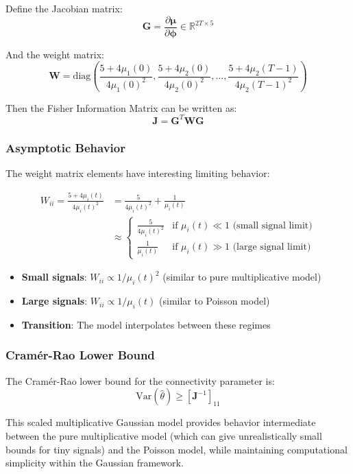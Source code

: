 Define the Jacobian matrix:
\begin{equation}
\mathbf{G} = \frac{\partial \boldsymbol{\mu}}{\partial \boldsymbol{\phi}} \in \mathbb{R}^{2T \times 5}
\end{equation}

And the weight matrix:
\begin{equation}
\mathbf{W} = \text{diag}\left(\frac{5 + 4\mu_1(0)}{4\mu_1(0)^2}, \frac{5 + 4\mu_2(0)}{4\mu_2(0)^2}, \ldots, \frac{5 + 4\mu_2(T-1)}{4\mu_2(T-1)^2}\right)
\end{equation}

Then the Fisher Information Matrix can be written as:
\begin{equation}
\mathbf{J} = \mathbf{G}^T \mathbf{W} \mathbf{G}
\end{equation}

\subsubsection{Asymptotic Behavior}

The weight matrix elements have interesting limiting behavior:

\begin{align}
W_{ii} = \frac{5 + 4\mu_i(t)}{4\mu_i(t)^2} &= \frac{5}{4\mu_i(t)^2} + \frac{1}{\mu_i(t)} \\
&\approx \begin{cases}
\frac{5}{4\mu_i(t)^2} & \text{if } \mu_i(t) \ll 1 \text{ (small signal limit)} \\
\frac{1}{\mu_i(t)} & \text{if } \mu_i(t) \gg 1 \text{ (large signal limit)}
\end{cases}
\end{align}

\begin{itemize}
\item \textbf{Small signals}: $W_{ii} \propto 1/\mu_i(t)^2$ (similar to pure multiplicative model)
\item \textbf{Large signals}: $W_{ii} \propto 1/\mu_i(t)$ (similar to Poisson model)
\item \textbf{Transition}: The model interpolates between these regimes
\end{itemize}

\subsubsection{Cramér-Rao Lower Bound}

The Cramér-Rao lower bound for the connectivity parameter is:
\begin{equation}
\text{Var}(\hat{\theta}) \geq [\mathbf{J}^{-1}]_{11}
\end{equation}

This scaled multiplicative Gaussian model provides behavior intermediate between the pure multiplicative model (which can give unrealistically small bounds for tiny signals) and the Poisson model, while maintaining computational simplicity within the Gaussian framework.